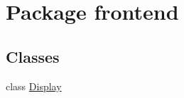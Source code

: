 \hypertarget{namespacefrontend}{}\section{Package frontend}
\label{namespacefrontend}
\subsection*{Classes}
\begin{DoxyCompactItemize}
\item 
class \hyperlink{classfrontend_1_1_display}{Display}
\end{DoxyCompactItemize}
